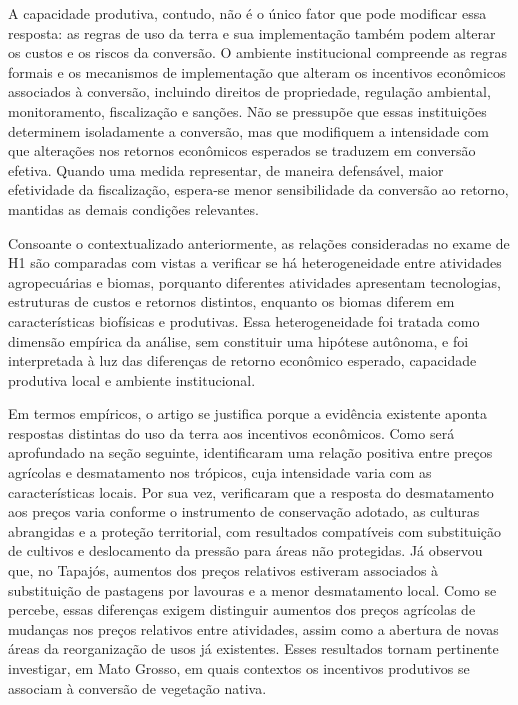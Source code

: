 A capacidade produtiva, contudo, não é o único fator que pode modificar essa resposta: as regras de uso da terra e sua implementação também podem alterar os custos e os riscos da conversão. O ambiente institucional compreende as regras formais e os mecanismos de implementação que alteram os incentivos econômicos associados à conversão, incluindo direitos de propriedade, regulação ambiental, monitoramento, fiscalização e sanções. Não se pressupõe que essas instituições determinem isoladamente a conversão, mas que modifiquem a intensidade com que alterações nos retornos econômicos esperados se traduzem em conversão efetiva. Quando uma medida representar, de maneira defensável, maior efetividade da fiscalização, espera-se menor sensibilidade da conversão ao retorno, mantidas as demais condições relevantes. 

Consoante o contextualizado anteriormente, as relações consideradas no exame de H1 são comparadas com vistas a verificar se há heterogeneidade entre atividades agropecuárias e biomas, porquanto diferentes atividades apresentam tecnologias, estruturas de custos e retornos distintos, enquanto os biomas diferem em características biofísicas e produtivas. Essa heterogeneidade foi tratada como dimensão empírica da análise, sem constituir uma hipótese autônoma, e foi interpretada à luz das diferenças de retorno econômico esperado, capacidade produtiva local e ambiente institucional.

Em termos empíricos, o artigo se justifica porque a evidência existente aponta respostas distintas do uso da terra aos incentivos econômicos. Como será aprofundado na seção seguinte,  identificaram uma relação positiva entre preços agrícolas e desmatamento nos trópicos, cuja intensidade varia com as características locais. Por sua vez,  verificaram que a resposta do desmatamento aos preços varia conforme o instrumento de conservação adotado, as culturas abrangidas e a proteção territorial, com resultados compatíveis com substituição de cultivos e deslocamento da pressão para áreas não protegidas. Já  observou que, no Tapajós, aumentos dos preços relativos estiveram associados à substituição de pastagens por lavouras e a menor desmatamento local. Como se percebe, essas diferenças exigem distinguir aumentos dos preços agrícolas de mudanças nos preços relativos entre atividades, assim como a abertura de novas áreas da reorganização de usos já existentes. Esses resultados tornam pertinente investigar, em Mato Grosso, em quais contextos os incentivos produtivos se associam à conversão de vegetação nativa. 

